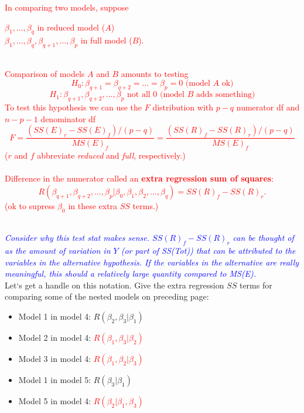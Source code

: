 \documentclass{article}
\begin{document}
\textcolor{red}{In comparing two models, suppose
\begin{center}
$\beta_1,\ldots,\beta_q$ in reduced model ($A$)\\
$\beta_1,\ldots,\beta_q,\beta_{q+1},\ldots,\beta_p$ in full model ($B$).
\end{center}
~\\Comparison of models $A$ and $B$ amounts to testing
$$H_0: \beta_{q+1} = \beta_{q+2} = \ldots = \beta_{p} =0 \text{ (model $A$ ok)}$$
$$H_1: \beta_{q+1} , \beta_{q+2} , \ldots , \beta_{p} \text{ not all 0 (model $B$ adds something)}$$
To test this hypothesis we can use the $F$ distribution with $p-q$ numerator df and $n-p-1$ denominator df
$$F = \frac{(SS(E)_r - SS(E)_f)/(p-q)}{MS(E)_f}=\frac{(SS(R)_f - SS(R)_r)/(p-q)}{MS(E)_f}$$
($r$ and $f$ abbreviate {\em reduced} and {\em full}, respectively.)\\~\\
Difference in the numerator called an \textbf{extra regression sum of squares}:
$$ R(\beta_{q+1},\beta_{q+2},\ldots,\beta_p|\beta_0,\beta_{1},\beta_{2},\ldots,\beta_q) = SS(R)_f-SS(R)_r.$$
(ok to supress $\beta_0$ in these extra $SS$ terms.)}\\

\textit{\textcolor{blue}{Consider why this test stat makes sense.  $SS(R)_f-SS(R)_r$ can be thought of as the amount of variation in $Y$ (or part of SS(Tot)) that can be attributed to the variables in the alternative hypothesis.  If the variables in the alternative are really meaningful, this should a relatively large quantity compared to MS(E).}}\\

Let`s get a handle on this notation.  Give the extra regression $SS$ terms for comparing some of the nested models on preceding page:
\begin{itemize}
\item Model 1 in model 4: $R(\beta_2,\beta_3|\beta_1)$
\item Model 2 in model 4: \textcolor{red}{$R(\beta_1,\beta_3|\beta_2) $} 
\item Model 3 in model 4: \textcolor{red}{$R(\beta_1,\beta_2|\beta_3) $} 
\item Model 1 in model 5: $R(\beta_3|\beta_1) $
\item Model 5 in model 4: \textcolor{red}{$R(\beta_2|\beta_1,\beta_3) $}
\end{itemize}
\end{document}
